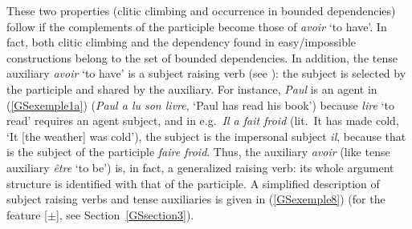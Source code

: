 {\eal 
	\label{GSexemple7}
	\label{GSexemple7a}
		
	\label{GSexemple7b}
		
	\label{GSexemple7c}
\zl

These two properties (clitic climbing and occurrence in bounded dependencies) follow if the complements of the participle become those of \emph{avoir} `to have'.
In fact, both clitic climbing and the dependency found in easy/impossible constructions belong to the set of bounded dependencies.
In addition, the tense auxiliary \emph{avoir} `to have' is a subject raising verb (see ): the subject is selected by the participle and shared by the auxiliary. For instance, \emph{Paul} is an agent in (\ref{GSexemple1a}) (\emph{Paul a lu son livre}, `Paul has read his book') because \emph{lire} `to read' requires an agent subject, and in e.g.\ \emph{Il a fait froid} (lit.\ It has made cold, `It [the weather] was cold'), the subject is the impersonal subject \emph{il}, because that is the subject of the participle \emph{faire froid}.
Thus, the auxiliary \emph{avoir} (like tense auxiliary \emph{\^etre} `to be') is, in fact, a generalized raising verb: its whole argument structure is identified with that of the participle. A simplified description of subject raising verbs and tense auxiliaries is given in (\ref{GSexemple8}) (for the feature [\light$\pm$], see Section~\ref{GSsection3}).

\begin{exe}
	\ex 	\label{GSexemple8}
	\begin{xlist}
	

\end{xlist}
\end{exe}}
